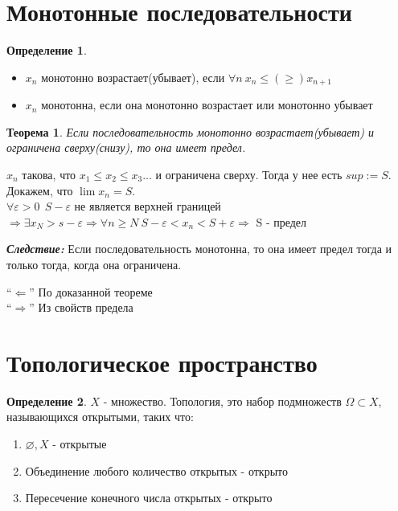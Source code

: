 \documentclass[12pt,letterpaper]{report}
\makeatletter
\newtheorem*{theorem-non}{Теорема}
\theoremstyle{definition}
\newtheorem*{conj}{Определение}
\newcommand{\follow}{\textbf{\textit{Следствие:}}}
\renewenvironment{proof}[1][\proofname]{%
   \par\pushQED{\qed}\normalfont%
   \topsep6\p@\@plus6\p@\relax
   \trivlist\item[\hskip\labelsep\bfseries#1\@addpunct{.}]%
   \ignorespaces
}{%
   \popQED\endtrivlist\@endpefalse
}
\makeatother
\begin{document}
    \section{Монотонные последовательности}
    
    \begin{conj}
        \quad \\
        \begin{itemize}
            \item[] $x_n$ монотонно возрастает(убывает), если $\forall n\ x_n\leq(\geq ) x_{n+1}$
            \item[] $x_n$ монотонна, если она монотонно возрастает или монотонно убывает
        \end{itemize}
    \end{conj}
    
    \begin{theorem-non}
        Если последовательность монотонно возрастает(убывает) и ограничена сверху(снизу), то она имеет предел.
    \end{theorem-non}
    \begin{proof}
        $x_n$ такова, что $x_1\leq x_2\leq x_3...$ и ограничена сверху. Тогда у нее есть $sup:=S$. Докажем, что $\lim x_n = S$. \\
        $\forall \varepsilon>0\ \ S-\varepsilon$ не является верхней границей $\Longrightarrow \exists x_N>s-\varepsilon \Longrightarrow \forall n\geq N\ S-\varepsilon < x_n < S+\varepsilon \Longrightarrow$ S - предел
    \end{proof}

    \follow \; Если последовательность монотонна, то она имеет предел тогда и только тогда, когда она ограничена.

    ``$\Longleftarrow$'' По доказанной теореме \\
    ``$\Longrightarrow$'' Из свойств предела
    
    \section{Топологическое пространство}
    
    \begin{conj}
        $X$ - множество. Топология, это набор подмножеств $\Omega \subset X$, называющихся открытыми, таких что: 
        \begin{enumerate}
            \item $\varnothing, X$ - открытые
            \item Объединение любого количество открытых - открыто
            \item Пересечение конечного числа открытых - открыто\\
        \end{enumerate}
    \end{conj}
    
\end{document}
